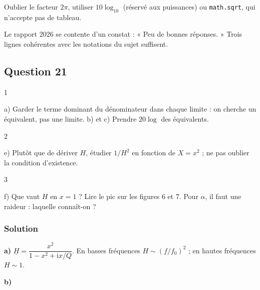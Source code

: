 \documentclass[11pt,a4paper]{article}
\begin{document}
\begin{piege}

Oublier le facteur \(2\pi\), utiliser \(10\log_{10}\) (réservé aux puissances) ou \texttt{math.sqrt}, qui n'accepte pas de tableau.

\end{piege}

\begin{jury}

Le rapport 2026 se contente d'un constat : « Peu de bonnes réponses. » Trois lignes cohérentes avec les notations du sujet suffisent.

\end{jury}

\hypertarget{question-21}{%
\subsection{Question 21}\label{question-21}}

\begin{indication}{1}

a) Garder le terme dominant du dénominateur dans chaque limite : on cherche un équivalent, pas une limite. b) et c) Prendre \(20\log\) des équivalents.

\end{indication}

\begin{indication}{2}

e) Plutôt que de dériver \(H\), étudier \(1/H^2\) en fonction de \(X=x^2\) ; ne pas oublier la condition d'existence.

\end{indication}

\begin{indication}{3}

f) Que vaut \(H\) en \(x=1\) ? Lire le pic sur les figures 6 et 7. Pour \(\alpha\), il faut une raideur : laquelle connaît-on ?

\end{indication}

\hypertarget{solution-20}{%
\subsubsection{Solution}\label{solution-20}}

\textbf{a)} \(\underline H=\dfrac{x^2}{1-x^2+\mathrm{i}x/Q}\). En basses fréquences \(H\sim(f/f_0)^2\) ; en hautes fréquences \(H\sim1\).

\textbf{b)}
\end{document}
